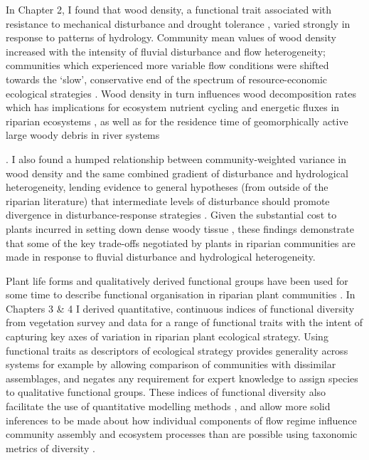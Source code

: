 \documentclass[openright,12pt,a4paper]{memoir}
\begin{document}
In Chapter 2, I found that wood density, a functional trait associated with resistance to mechanical disturbance and drought tolerance \citep{Chave2009, Niklas2010}, varied strongly in response to patterns of hydrology. Community mean values of wood density increased with the intensity of fluvial disturbance and flow heterogeneity; communities which experienced more variable flow conditions were shifted towards the ‘slow’, conservative end of the spectrum of resource-economic ecological strategies \citep{Reich2014a}. Wood density in turn influences wood decomposition rates \citep{Mori2013} which has implications for ecosystem nutrient cycling and energetic fluxes in riparian ecosystems \citep{Harmon1986}, as well as for the residence time of geomorphically active large woody debris in river systems {\citep{Gurnell2002, Cadol2010}. I also found a humped relationship between community-weighted variance in wood density and the same combined gradient of disturbance and hydrological heterogeneity, lending evidence to general hypotheses (from outside of the riparian literature) that intermediate levels of disturbance should promote divergence in disturbance-response strategies \citep{Grime2006, Sonnier2010}. Given the substantial cost to plants incurred in setting down dense woody tissue \citep{Falster2006}, these findings demonstrate that some of the key trade-offs negotiated by plants in riparian communities are made in response to fluvial disturbance and hydrological heterogeneity.
 
Plant life forms and qualitatively derived functional groups have been used for some time to describe functional organisation in riparian plant communities \citep{Brinson1993, Stromberg2010, Stromberg2013}. In Chapters 3 \& 4 I derived quantitative, continuous indices of functional diversity from vegetation survey and data for a range of functional traits with the intent of capturing key axes of variation in riparian plant ecological strategy. Using functional traits as descriptors of ecological strategy provides generality across systems \citep{Lavorel2002, Suding2008} for example by allowing comparison of communities with dissimilar assemblages, and negates any requirement for expert knowledge to assign species to qualitative functional groups. These indices of functional diversity also facilitate the use of quantitative modelling methods \citep{Mason2013}, and allow more solid inferences to be made about how individual components of flow regime influence community assembly and ecosystem processes than are possible using taxonomic metrics of diversity \citep{Tilman1997, Diaz1998}.

}
\end{document}
